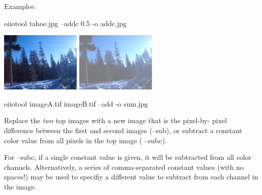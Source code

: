 

\noindent Examples:
\begin{code}
    oiiotool tahoe.jpg --addc 0.5 -o addc.jpg
\end{code}
\spc \includegraphics[width=1.5in]{figures/tahoe-small.jpg}
\raisebox{40pt}{\large $\rightarrow$}
\includegraphics[width=1.5in]{figures/addc.jpg} \\

\vspace{12pt}

\begin{code}
    oiiotool imageA.tif imageB.tif --add -o sum.jpg
\end{code}
\apiend

Replace the \emph{two} top images with a new image that is the pixel-by-
pixel difference between the first and second images ({\cf --sub}), or
subtract a constant color value from all pixels in the top image ({\cf
--subc}).

For {\cf --subc}, if a single constant value is given, it will be subtracted
from all color channels. Alternatively, a series of comma-separated constant
values (with no spaces!) may be used to specifiy a different value to
subtract from each channel in the image.
\apiend

